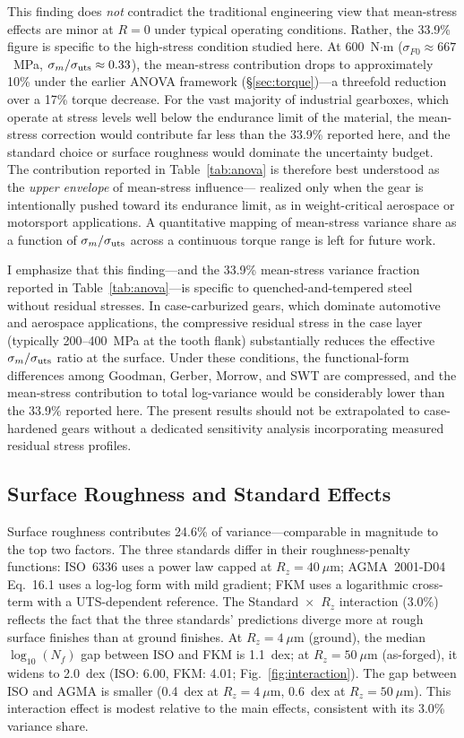 \documentclass[12pt,a4paper]{article}
\begin{document}
This finding does \emph{not} contradict the traditional engineering
view that mean-stress effects are minor at $R=0$ under typical
operating conditions. Rather, the 33.9\% figure is specific to the
high-stress condition studied here. At 600~N$\cdot$m
($\sigma_{F0}\approx 667$~MPa, $\sigma_m/\sigma_{\rm uts}\approx 0.33$),
the mean-stress contribution drops to approximately 10\% under the
earlier ANOVA framework (\S\ref{sec:torque})---a threefold reduction
over a 17\% torque decrease. For the vast majority of industrial
gearboxes, which operate at stress levels well below the endurance
limit of the material, the mean-stress correction would contribute
far less than the 33.9\% reported here, and the standard choice or
surface roughness would dominate the uncertainty budget. The
contribution reported in Table~\ref{tab:anova} is therefore best
understood as the \emph{upper envelope} of mean-stress influence---
realized only when the gear is intentionally pushed toward its
endurance limit, as in weight-critical aerospace or motorsport
applications. A quantitative mapping of mean-stress variance share
as a function of $\sigma_m/\sigma_{\rm uts}$ across a continuous
torque range is left for future work.

I emphasize that this finding---and the 33.9\% mean-stress variance
fraction reported in Table~\ref{tab:anova}---is specific to
quenched-and-tempered steel without residual stresses. In
case-carburized gears, which dominate automotive and aerospace
applications, the compressive residual stress in the case layer
(typically 200--400~MPa at the tooth flank) substantially reduces the
effective $\sigma_m/\sigma_{\rm uts}$ ratio at the surface. Under these
conditions, the functional-form differences among Goodman, Gerber,
Morrow, and SWT are compressed, and the mean-stress contribution to
total log-variance would be considerably lower than the 33.9\% reported
here. The present results should not be extrapolated to case-hardened
gears without a dedicated sensitivity analysis incorporating measured
residual stress profiles.

\subsection{Surface Roughness and Standard Effects}

Surface roughness contributes 24.6\% of variance---comparable in magnitude
to the top two factors. The three standards differ in their
roughness-penalty functions: ISO~6336 uses a power law capped at
$R_z=40~\mu$m; AGMA~2001-D04 Eq.~16.1 uses a log-log form with mild
gradient; FKM uses a logarithmic cross-term with a UTS-dependent
reference. The Standard~$\times$~$R_z$ interaction (3.0\%) reflects the
fact that the three standards' predictions diverge more at rough surface
finishes than at ground finishes. At $R_z=4~\mu$m (ground), the median
$\log_{10}(N_f)$ gap between ISO and FKM is 1.1~dex; at
$R_z=50~\mu$m (as-forged), it widens to 2.0~dex (ISO: 6.00, FKM: 4.01;
Fig.~\ref{fig:interaction}). The gap between ISO and AGMA is smaller
(0.4~dex at $R_z=4~\mu$m, 0.6~dex at $R_z=50~\mu$m). This interaction
effect is modest relative to the main effects, consistent with its
3.0\% variance share.
\end{document}
